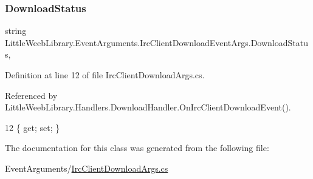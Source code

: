 \subsubsection{\texorpdfstring{Download\+Status}{DownloadStatus}}
{\footnotesize\ttfamily string Little\+Weeb\+Library.\+Event\+Arguments.\+Irc\+Client\+Download\+Event\+Args.\+Download\+Status\hspace{0.3cm}{\ttfamily [get]}, {\ttfamily [set]}}



Definition at line 12 of file Irc\+Client\+Download\+Args.\+cs.



Referenced by Little\+Weeb\+Library.\+Handlers.\+Download\+Handler.\+On\+Irc\+Client\+Download\+Event().


\begin{DoxyCode}
12 \{ \textcolor{keyword}{get}; \textcolor{keyword}{set}; \}
\end{DoxyCode}


The documentation for this class was generated from the following file\+:\begin{DoxyCompactItemize}
\item 
Event\+Arguments/\mbox{\hyperlink{_irc_client_download_args_8cs}{Irc\+Client\+Download\+Args.\+cs}}\end{DoxyCompactItemize}
